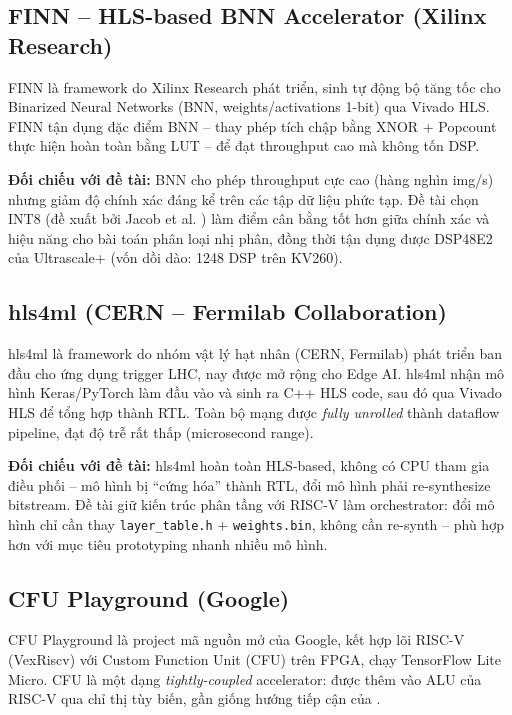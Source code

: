 \subsection{FINN -- HLS-based BNN Accelerator (Xilinx Research)}
FINN \cite{finn_paper} là framework do Xilinx Research phát triển, sinh tự động bộ tăng tốc cho Binarized Neural Networks (BNN, weights/activations 1-bit) qua Vivado HLS. FINN tận dụng đặc điểm BNN -- thay phép tích chập bằng XNOR + Popcount thực hiện hoàn toàn bằng LUT -- để đạt throughput cao mà không tốn DSP.

\textbf{Đối chiếu với đề tài:} BNN cho phép throughput cực cao (hàng nghìn img/s) nhưng giảm độ chính xác đáng kể trên các tập dữ liệu phức tạp. Đề tài chọn INT8 (đề xuất bởi Jacob et al. \cite{jacob2018quantization}) làm điểm cân bằng tốt hơn giữa chính xác và hiệu năng cho bài toán phân loại nhị phân, đồng thời tận dụng được DSP48E2 của Ultrascale+ (vốn dồi dào: 1248 DSP trên KV260).

\subsection{hls4ml (CERN -- Fermilab Collaboration)}
hls4ml \cite{hls4ml} là framework do nhóm vật lý hạt nhân (CERN, Fermilab) phát triển ban đầu cho ứng dụng trigger LHC, nay được mở rộng cho Edge AI. hls4ml nhận mô hình Keras/PyTorch làm đầu vào và sinh ra C++ HLS code, sau đó qua Vivado HLS để tổng hợp thành RTL. Toàn bộ mạng được \textit{fully unrolled} thành dataflow pipeline, đạt độ trễ rất thấp (microsecond range).

\textbf{Đối chiếu với đề tài:} hls4ml hoàn toàn HLS-based, không có CPU tham gia điều phối -- mô hình bị ``cứng hóa'' thành RTL, đổi mô hình phải re-synthesize bitstream. Đề tài giữ kiến trúc phân tầng với RISC-V làm orchestrator: đổi mô hình chỉ cần thay \texttt{layer\_table.h} + \texttt{weights.bin}, không cần re-synth -- phù hợp hơn với mục tiêu prototyping nhanh nhiều mô hình.

\subsection{CFU Playground (Google)}
CFU Playground \cite{cfu_playground} là project mã nguồn mở của Google, kết hợp lõi RISC-V (VexRiscv) với Custom Function Unit (CFU) trên FPGA, chạy TensorFlow Lite Micro. CFU là một dạng \textit{tightly-coupled} accelerator: được thêm vào ALU của RISC-V qua chỉ thị tùy biến, gần giống hướng tiếp cận của \cite{parameshwara2025fpga}.

